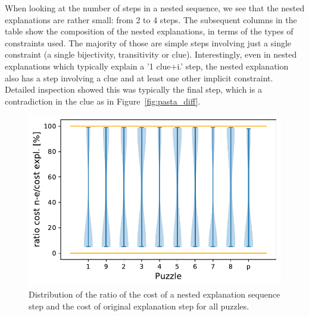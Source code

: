 When looking at the number of steps in a nested sequence, we see that the nested explanations are rather small: from 2 to 4 steps.
The subsequent columns in the table show the composition of the nested explanations, in terms of the types of constraints used. 
The majority of those are simple steps involving just a single constraint (a single bijectivity, transitivity or clue). 
Interestingly, even in nested explanations which typically explain a '1 clue+i.' step, the nested explanation also has a step involving a clue and at least one other implicit constraint. 
Detailed inspection showed this was typically the final step, which is a contradiction in the clue as in Figure~\ref{fig:pasta_diff}. 


\begin{figure}[h]
	\centering
	\includegraphics[width=.6\textwidth]{figures/violin_plot.pdf}
	\caption{Distribution of the ratio of the cost of a nested explanation sequence step and the cost of original explanation step for all puzzles. } 
	\label{fig:experiments:violin}
\end{figure}


